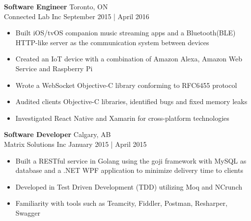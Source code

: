 \documentclass[a4paper]{article}
\begin{document}
\textbf{\normalsize Software Engineer} \hfill Toronto, ON\\ 
\textcolor{jobGray}{Connected Lab Inc} \hfill \textcolor{dateGray}{September 2015 | April 2016}\\
\vspace{-2mm}
\begin{itemize}[leftmargin=1cm ] \itemsep -0.5pt
	\item Built iOS/tvOS companion music streaming apps and a Bluetooth(BLE) HTTP-like server as the communication system between devices
	\item Created an IoT device with a combination of Amazon Alexa, Amazon Web Service and Raspberry Pi
	\item Wrote a WebSocket Objective-C library conforming to RFC6455 protocol
	\item Audited client\textquotesingle{}s Objective-C libraries, identified bugs and fixed memory leaks 
	\item Investigated React Native and Xamarin for cross-platform technologies
\end{itemize}

\textbf{\normalsize Software Developer} \hfill Calgary, AB\\
\textcolor{jobGray}{Matrix Solutions Inc} \hfill \textcolor{dateGray}{January 2015 | April 2015}\\
\vspace{-2mm}
\begin{itemize}[leftmargin=1cm ]\itemsep -0.5pt
	\item Built a RESTful service in Golang using the goji framework with MySQL as database and a .NET WPF application to minimize delivery time to clients
	\item Developed in Test Driven Development (TDD) utilizing Moq and NCrunch
	\item Familiarity with tools such as Teamcity, Fiddler, Postman, Resharper, Swagger
\end{itemize}
\end{document}
